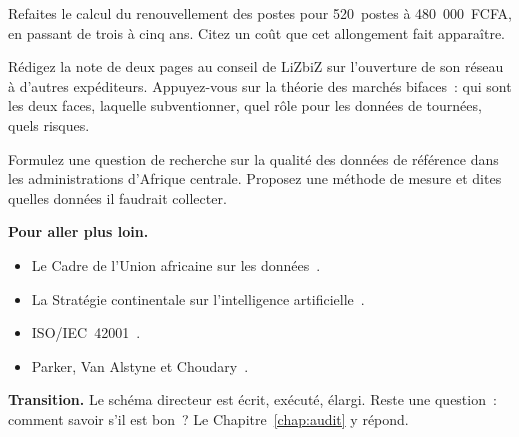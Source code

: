 \begin{boxexo}[title={\ding{45}\quad Exercice~15.3. La sobriété \niveaumoyen}]
Refaites le calcul du renouvellement des postes pour 520~postes à 480~000~FCFA, en passant de trois à cinq ans. Citez un coût que cet allongement fait apparaître.
\end{boxexo}

\begin{boxexo}[title={\ding{45}\quad Exercice~15.4. LiZbiZ plateforme \niveauexpert}]
Rédigez la note de deux pages au conseil de LiZbiZ sur l'ouverture de son réseau à d'autres expéditeurs. Appuyez-vous sur la théorie des marchés bifaces~: qui sont les deux faces, laquelle subventionner, quel rôle pour les données de tournées, quels risques.
\end{boxexo}

\begin{boxexo}[title={\ding{45}\quad Exercice~15.5. Question de recherche \niveauexpert}]
Formulez une question de recherche sur la qualité des données de référence dans les administrations d'Afrique centrale. Proposez une méthode de mesure et dites quelles données il faudrait collecter.
\end{boxexo}

\bigskip

\begin{boxinfo}
\textbf{Pour aller plus loin.}
\begin{itemize}
    \item Le Cadre de l'Union africaine sur les données~\cite{ua2022donnees}.
    \item La Stratégie continentale sur l'intelligence artificielle~\cite{ua2024ia}.
    \item ISO/IEC~42001~\cite{iso42001}.
    \item Parker, Van Alstyne et Choudary~\cite{parker2016}.
\end{itemize}
\end{boxinfo}

\begin{boxinfo}
\textbf{Transition.} Le schéma directeur est écrit, exécuté, élargi. Reste une question~: comment savoir s'il est bon~? Le Chapitre~\ref{chap:audit} y répond.
\end{boxinfo}

